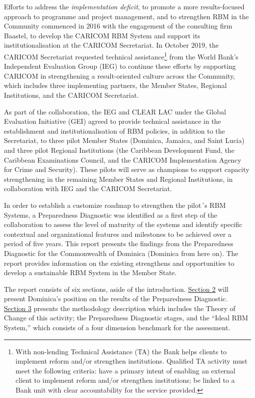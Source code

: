 \documentclass[
  10pt,
]{book}
\begin{document}
Efforts to address the \emph{implementation deficit}, to promote a more results-focused approach to programme and project management, and to strengthen RBM in the Community commenced in 2016 with the engagement of the consulting firm Baastel, to develop the CARICOM RBM System and support its institutionalisation at the CARICOM Secretariat. In October 2019, the CARICOM Secretariat requested technical assistance\footnote{With non-lending Technical Assistance (TA) the Bank helps clients to implement reform and/or strengthen institutions. Qualified TA activity must meet the following criteria: have a primary intent of enabling an external client to implement reform and/or strengthen institutions; be linked to a Bank unit with clear accountability for the service provided.} from the World Bank's Independent Evaluation Group (IEG) to continue these efforts by supporting CARICOM in strengthening a result-oriented culture across the Community, which includes three implementing partners, the Member States, Regional Institutions, and the CARICOM Secretariat.

As part of the collaboration, the IEG and CLEAR LAC under the Global Evaluation Initiative (GEI) agreed to provide technical assistance in the establishment and institutionalisation of RBM policies, in addition to the Secretariat, to three pilot Member States (Dominica, Jamaica, and Saint Lucia) and three pilot Regional Institutions (the Caribbean Development Fund, the Caribbean Examinations Council, and the CARICOM Implementation Agency for Crime and Security). These pilots will serve as champions to support capacity strengthening in the remaining Member States and Regional Institutions, in collaboration with IEG and the CARICOM Secretariat.

In order to establish a customize roadmap to strengthen the pilot´s RBM Systems, a Preparedness Diagnostic was identified as a first step of the collaboration to assess the level of maturity of the systems and identify specific contextual and organizational features and milestones to be achieved over a period of five years.
This report presents the findings from the Preparedness Diagnostic for the Commonwealth of Dominica (Dominica from here on). The report provides information on the existing strengthens and opportunities to develop a sustainable RBM System in the Member State.

The report consists of six sections, aside of the introduction. \protect\hyperlink{section2}{Section 2} will present Dominica's position on the results of the Preparedness Diagnostic. \protect\hyperlink{section3}{Section 3} presents the methodology description which includes the Theory of Change of this activity; the Preparedness Diagnostic stages, and the ``Ideal RBM System,'' which consists of a four dimension benchmark for the assessment.
\end{document}
